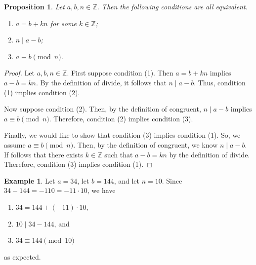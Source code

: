 \documentclass[10pt, titlepage]{amsart}
\newcommand\Z{{\mathbb Z}}
\newcommand\N{{\mathbb N}}
\newtheorem{theorem}{Theorem}[subsection]
\newtheorem{prop}{Proposition}[subsection]
\theoremstyle{definition}
\newtheorem{example}{Example}[subsection]
\begin{document}
	\begin{prop}\label{proposition:equivalent_conditions_for_congruent}
		Let $a, b, n \in \Z$. Then the following conditions are all equivalent.
		\begin{enumerate}
			\item $a = b + kn$ for some $k \in \Z$;
			\item $n \mid a - b$;
			\item $a \equiv b \pmod n$.
		\end{enumerate}		
	\end{prop}
	
	\begin{proof}
		Let $a, b, n \in \Z$.
		First suppose condition (1).
		Then $a = b + kn$ implies $a-b = kn$.
		By the definition of divide, it follows that $n \mid a - b$.
		Thus, condition (1) implies condition (2).
		
		Now suppose condition (2).
		Then, by the definition of congruent, $n \mid a - b$ implies $a \equiv b \pmod n$.
		Therefore, condition (2) implies condition (3).
		
		Finally, we would like to show that condition (3) implies condition (1).
		So, we assume $a \equiv b \pmod n$.
		Then, by the definition of congruent, we know $n \mid a - b$.
		If follows that there exists $k \in \Z$ such that $a-b = kn$ by the definition of divide.
		Therefore, condition (3) implies condition (1).

	\end{proof}
	
	
%	
	\begin{example}\label{example:congruent}
		Let $a = 34$, let $b = 144$, and let $n = 10$. Since $34 - 144 = -110 = -11 \cdot 10$, we have
		\begin{enumerate}
			\item $34 = 144 + (-11) \cdot 10$,
			\item $10 \mid 34 - 144$, and
			\item $34 \equiv 144 \pmod{10}$
		\end{enumerate}
		as expected.
	\end{example}
	
\end{document}
